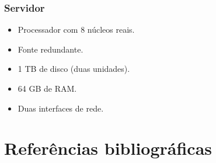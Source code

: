 \documentclass[	DIV=calc,%
							paper=a4,%
							fontsize=12pt,%
							onecolumn]{scrartcl}	 					%
\begin{document}
\subsubsection{Servidor}

\begin{itemize}
	\item Processador com 8 núcleos reais.
	\item Fonte redundante.
	\item 1 TB de disco (duas unidades).
	\item 64 GB de RAM.
	\item Duas interfaces de rede.
\end{itemize}

\pagebreak
\section{Referências bibliográficas}

\renewcommand\refname{} %

  
\end{document}

